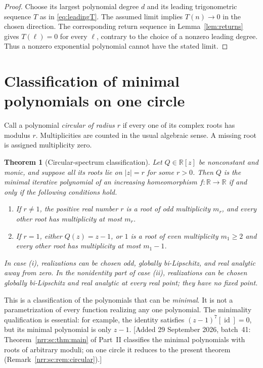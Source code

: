 \documentclass[11pt,letterpaper]{article}
\newtheorem{theorem}{Theorem}[section]
\theoremstyle{definition}
\theoremstyle{remark}
\newcommand{\R}{\mathbb R}
\newcommand{\id}{\operatorname{id}}
\begin{document}
\begin{proof}
Choose its largest polynomial degree $d$ and its leading trigonometric
sequence $T$ as in \eqref{eq:leadingT}. The assumed limit implies
$T(n)\to0$ in the chosen direction. The corresponding return sequence
in Lemma~\ref{lem:returns} gives $T(\ell)=0$ for every $\ell$, contrary
to the choice of a nonzero leading degree. Thus a nonzero exponential
polynomial cannot have the stated limit.
\end{proof}

\section{Classification of minimal polynomials on one circle}
\label{sec:classification}

Call a polynomial \emph{circular of radius $r$} if every one of its complex
roots has modulus $r$. Multiplicities are counted in the usual algebraic
sense. A missing root is assigned multiplicity zero.

\begin{theorem}[Circular-spectrum classification]
\label{thm:classification}
Let $Q\in\R[z]$ be nonconstant and monic, and suppose all its roots lie
on $|z|=r$ for some $r>0$. Then $Q$ is the minimal iterative polynomial
of an increasing homeomorphism $f:\R\to\R$ if and only if the following
conditions hold.
\begin{enumerate}[label=\textnormal{(\roman*)},leftmargin=2.2em]
\item If $r\ne1$, the positive real number $r$ is a root of odd
multiplicity $m_r$, and every other root has multiplicity at most $m_r$.
\item If $r=1$, either $Q(z)=z-1$, or $1$ is a root of even multiplicity
$m_1\ge2$ and every other root has multiplicity at most $m_1-1$.
\end{enumerate}
In case \textnormal{(i)}, realizations can be chosen odd, globally
bi-Lipschitz, and real analytic away from zero. In the nonidentity part of
case \textnormal{(ii)}, realizations can be chosen globally bi-Lipschitz
and real analytic at every real point; they have no fixed point.
\end{theorem}

This is a classification of the polynomials that can be \emph{minimal}.
It is not a parametrization of every function realizing any one polynomial.
The minimality qualification is essential: for example, the identity
satisfies $(z-1)^7[\id]=0$, but its minimal polynomial is only $z-1$.
[Added 29 September 2026, batch~41: Theorem~\ref{nrr:sc:thm:main} of Part~II
classifies the minimal polynomials with roots of arbitrary moduli; on one
circle it reduces to the present theorem
(Remark~\ref{nrr:sc:rem:circular}).]
\end{document}
